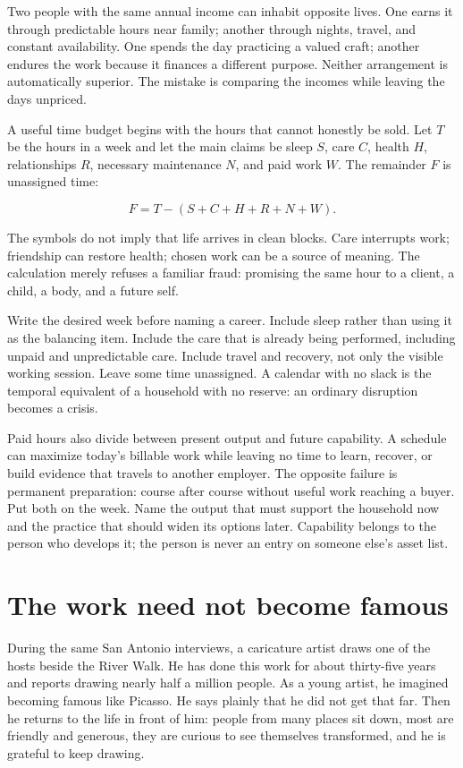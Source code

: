 Two people with the same annual income can inhabit opposite lives. One earns it
through predictable hours near family; another through nights, travel, and
constant availability. One spends the day practicing a valued craft; another
endures the work because it finances a different purpose. Neither arrangement
is automatically superior. The mistake is comparing the incomes while leaving
the days unpriced.

A useful time budget begins with the hours that cannot honestly be sold. Let
$T$ be the hours in a week and let the main claims be sleep $S$, care $C$,
health $H$, relationships $R$, necessary maintenance $N$, and paid work $W$.
The remainder $F$ is unassigned time:

\begin{equation}
F = T - (S+C+H+R+N+W).
\end{equation}

The symbols do not imply that life arrives in clean blocks. Care interrupts
work; friendship can restore health; chosen work can be a source of meaning.
The calculation merely refuses a familiar fraud: promising the same hour to a
client, a child, a body, and a future self.

Write the desired week before naming a career. Include sleep rather than using
it as the balancing item. Include the care that is already being performed,
including unpaid and unpredictable care. Include travel and recovery, not only
the visible working session. Leave some time unassigned. A calendar with no
slack is the temporal equivalent of a household with no reserve: an ordinary
disruption becomes a crisis.

Paid hours also divide between present output and future capability. A schedule
can maximize today's billable work while leaving no time to learn, recover, or
build evidence that travels to another employer. The opposite failure is
permanent preparation: course after course without useful work reaching a
buyer. Put both on the week. Name the output that must support the household
now and the practice that should widen its options later. Capability belongs
to the person who develops it; the person is never an entry on someone else's
asset list.

\section{The work need not become famous}

During the same San Antonio interviews, a caricature artist draws one of the
hosts beside the River Walk. He has done this work for about
thirty-five years and reports drawing nearly half a million people. As a young
artist, he imagined becoming famous like Picasso. He says plainly that he did
not get that far. Then he returns to the life in front of him: people from many
places sit down, most are friendly and generous, they are curious to see
themselves transformed, and he is grateful to keep drawing.

